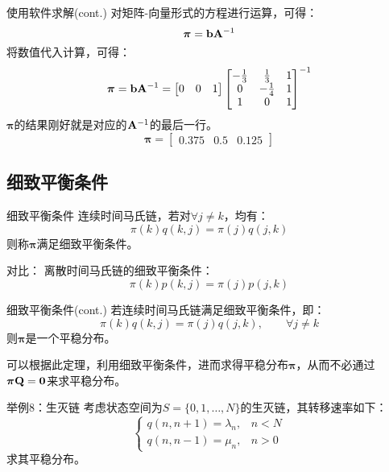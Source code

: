 \documentclass[t]{beamer}
\begin{document}
  \begin{frame}{使用软件求解(cont.)}
  对矩阵-向量形式的方程进行运算，可得：
  \begin{equation*}
   \bm{\pi}={\bf b}{\bf A}^{-1}
  \end{equation*}
  将数值代入计算，可得：
\[\bm{\pi}={\bf b}{\bf A}^{-1}=\begin{bmatrix}
0&0&1
\end{bmatrix}\begin{bmatrix}
-\frac{1}{3}&\frac{1}{3}&1\\
 0&-\frac{1}{4}&1\\
1 &0&1
\end{bmatrix}^{-1} \]
$\bm{\pi}$的结果刚好就是对应的${\bf A}^{-1}$的最后一行。
\[\bm{\pi}=\begin{bmatrix}
0.375&    0.5&    0.125
\end{bmatrix} \]
\end{frame}

\subsection{细致平衡条件}
\begin{frame}{细致平衡条件}
  连续时间马氏链，若对$\forall j\ne k$，均有：
  \begin{equation*}
    \pi(k)q(k,j)=\pi(j)q(j,k)
  \end{equation*}
  则称$\bm{\pi}$满足细致平衡条件。

  \begin{block}{对比：}
    离散时间马氏链的细致平衡条件：
\begin{equation*}
\pi(k)p(k,j)=\pi(j)p(j,k)
\end{equation*}
  \end{block}
\end{frame}


\begin{frame}{细致平衡条件(cont.)}
  若连续时间马氏链满足细致平衡条件，即：
  \[\pi(k)q(k,j)=\pi(j)q(j,k),\qquad  \forall j\ne k\]
  则${\bm{\pi}}$是一个平稳分布。

  可以根据此定理，利用细致平衡条件，进而求得平稳分布${\bm{\pi}}$，从而不必通过${\bm{\pi}}{\bf Q}={\bf 0}$来求平稳分布。
\end{frame}

\begin{frame}{举例8：生灭链}
  考虑状态空间为$S=\{0,1,\ldots,N\}$的生灭链，其转移速率如下：
  \[\begin{cases}
  q(n,n+1)=\lambda_n,& n<N\\
  q(n,n-1)=\mu_n,& n>0
  \end{cases} \]
  求其平稳分布。
\end{frame}
\end{document}
